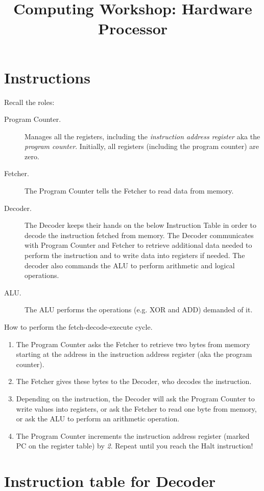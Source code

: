 \documentclass[11pt]{article}
\title{Computing Workshop: Hardware\\Processor}
\begin{document}
\maketitle

\section*{Instructions}

Recall the roles:
\begin{description}
\item[Program Counter.]
  Manages all the registers, including the \emph{instruction address register}
  aka the \emph{program counter}.
  Initially, all registers (including the program counter) are zero.
\item[Fetcher.]
  The Program Counter tells the Fetcher to read data from memory.
\item[Decoder.]
  The Decoder keeps their hands on the below Instruction Table in order to
  decode the instruction fetched from memory.
  The Decoder communicates with Program Counter and Fetcher to retrieve
  additional data needed to perform the instruction and to write data into
  registers if needed.
  The decoder also commands the ALU to perform arithmetic and logical operations.
\item[ALU.]
  The ALU performs the operations (e.g. XOR and ADD) demanded of it.
\end{description}

How to perform the fetch-decode-execute cycle.
\begin{enumerate}
\item
  The Program Counter asks the Fetcher to retrieve two bytes from memory
  starting at the address in the instruction address register (aka the program
  counter).
\item
  The Fetcher gives these bytes to the Decoder, who decodes the instruction.
\item
  Depending on the instruction, the Decoder will ask the Program Counter to
  write values into registers, or ask the Fetcher to read one byte from memory,
  or ask the ALU to perform an arithmetic operation.
\item
  The Program Counter increments the instruction address register (marked PC on
  the register table) by \emph{2}.
  Repeat until you reach the Halt instruction!
\end{enumerate}

\newpage

\section*{Instruction table for Decoder}
\end{document}
